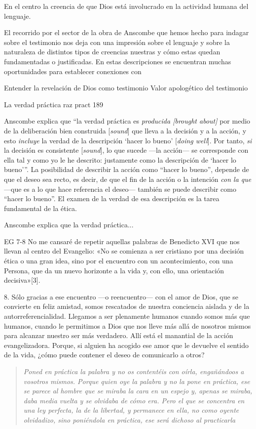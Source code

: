 En el centro
la creencia de que Dios está involucrado en la actividad humana del lenguaje.



El recorrido por el sector de la obra de Anscombe que hemos hecho para indagar sobre el testimonio nos deja con una impresión sobre el lenguaje y sobre la naturaleza de distintos tipos de creencias nuestras y cómo estas quedan fundamentadas o justificadas. En estas descripciones se encuentran muchas oportunidades para establecer conexiones con

Entender la revelación de Dios como testimonio
Valor apologético del testimonio

La verdad práctica raz pract 189

Anscombe explica que ``la verdad práctica es \emph{producida [brought about]} por medio de la deliberación bien construida [\emph{sound}] que lleva a la decisión y a la acción, y esto \emph{incluye} la verdad de la descripción `hacer lo bueno' [\emph{doing well}]. Por tanto, \emph{si} la decisión es consistente [\emph{sound}], lo que sucede ---la acción--- se corresponde con ella tal y como yo le he descrito: justamente como la descripción de `hacer lo bueno'''. La posibilidad de describir la acción como ``hacer lo bueno'', depende de que el deseo sea recto, es decir, de que el fin de la acción o la intención \emph{con la que} ---que es a lo que hace referencia el deseo--- también se puede describir como ``hacer lo bueno''. El examen de la verdad de esa descripción es la tarea fundamental de la ética.

Anscombe explica que la verdad práctica...

EG 7-8
No me cansaré de repetir aquellas palabras de Benedicto XVI que nos llevan al centro del Evangelio: «No se comienza a ser cristiano por una decisión ética o una gran idea, sino por el encuentro con un acontecimiento, con una Persona, que da un nuevo horizonte a la vida y, con ello, una orientación decisiva»[3].

8. Sólo gracias a ese encuentro —o reencuentro— con el amor de Dios, que se convierte en feliz amistad, somos rescatados de nuestra conciencia aislada y de la autorreferencialidad. Llegamos a ser plenamente humanos cuando somos más que humanos, cuando le permitimos a Dios que nos lleve más allá de nosotros mismos para alcanzar nuestro ser más verdadero. Allí está el manantial de la acción evangelizadora. Porque, si alguien ha acogido ese amor que le devuelve el sentido de la vida, ¿cómo puede contener el deseo de comunicarlo a otros?


\blockquote[][\,(St 1, 22-25)]{\emph{Poned en práctica la palabra y no os contentéis con oírla, engañándoos a vosotros mismos. Porque quien oye la palabra y no la pone en práctica, ese se parece al hombre que se miraba la cara en un espejo y, apenas se miraba, daba media vuelta y se olvidaba de cómo era. Pero el que se concentra en una ley perfecta, la de la libertad, y permanece en ella, no como oyente olvidadizo, sino poniéndola en práctica, ese será dichoso al practicarla}}.

